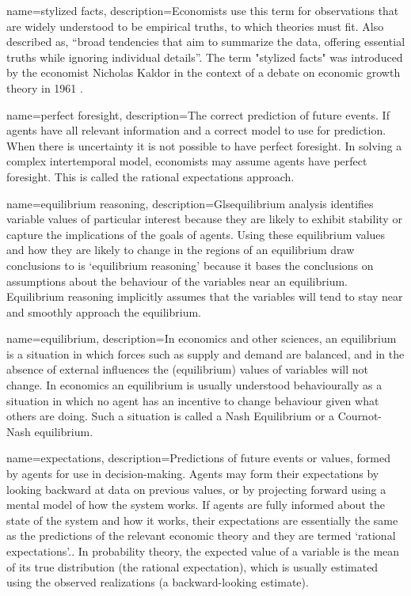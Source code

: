 {
name=stylized facts,
description={Economists use this term for observations that are widely understood to be empirical truths, to which theories must fit.  Also described as, ``broad tendencies that aim to summarize the data, offering essential truths while ignoring individual details''. The term "stylized facts" was introduced by the economist Nicholas Kaldor in the context of a debate on economic growth theory in 1961 \cite{kaldorCapitalAccumulationEconomic1961}.}
}

{
name=perfect foresight,
description={The correct prediction of future events. If agents have  all relevant information and  a correct model to use for prediction. When there is uncertainty it is not possible to have perfect foresight. In solving a complex intertemporal model, economists may assume agents have perfect foresight. This is called the rational expectations approach.}
}

{
name=equilibrium reasoning,
description={Gls{equilibrium} analysis identifies variable values of particular interest because they are likely to exhibit stability or capture the implications of the goals of agents. Using these equilibrium values and how they are likely to change in the regions of an equilibrium draw conclusions to is `equilibrium reasoning' because it bases the conclusions on assumptions about the behaviour of the variables near an equilibrium. Equilibrium reasoning implicitly  assumes that the variables will tend to stay near and smoothly approach the equilibrium.}
}

{
name=equilibrium,
description={In economics and other sciences, an equilibrium is a situation in which forces such as supply and demand are balanced, and in the absence of external influences the (equilibrium) values of variables will not change. In economics an equilibrium is usually understood behaviourally as a situation in which no agent has an incentive to change behaviour given what others are doing. Such a situation is called a Nash Equilibrium or a Cournot-Nash equilibrium.}
}

{
name=expectations,
description={Predictions of future events or values, formed by agents for use in decision-making. Agents may form their expectations by looking backward at data on previous values, or by projecting forward using a mental model of how the system works. If agents are fully informed about the state of the system and how it works, their expectations are essentially the same as the predictions of the relevant economic theory and they are termed `rational expectations'.\cite{muthRationalExpectationsTheory1961}. In probability theory, the expected value of a variable is the mean of its true distribution (the rational expectation), which is usually estimated using the observed realizations (a backward-looking estimate).}
}

